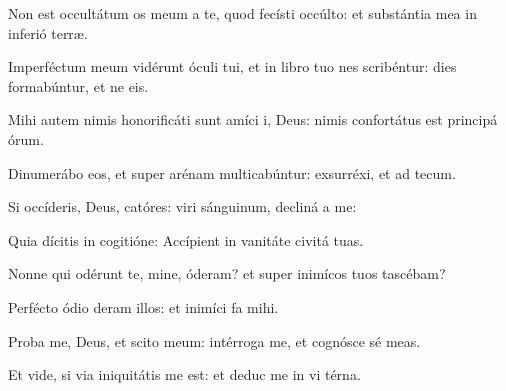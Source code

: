 \item {}

\item Non est occultátum os meum a te, quod fecísti  occúlto:\psstar{} et substántia mea in inferió terræ.

\item Imperféctum meum vidérunt óculi tui,\pscross{} et in libro tuo nes scribéntur:\psstar{} dies formabúntur, et ne  eis.

\item Mihi autem nimis honorificáti sunt amíci i, Deus:\psstar{} nimis confortátus est principá órum.

\item Dinumerábo eos, et super arénam multicabúntur:\psstar{} exsurréxi, et ad  tecum.

\item Si occíderis, Deus, catóres:\psstar{} viri sánguinum, decliná a me:

\item Quia dícitis in cogitióne:\psstar{} Accípient in vanitáte civitá tuas.

\item Nonne qui odérunt te, mine, óderam?\psstar{} et super inimícos tuos tascébam?

\item Perfécto ódio deram illos:\psstar{} et inimíci fa  mihi.

\item Proba me, Deus, et scito  meum:\psstar{} intérroga me, et cognósce sé meas.

\item Et vide, si via iniquitátis  me est:\psstar{} et deduc me in vi térna.
